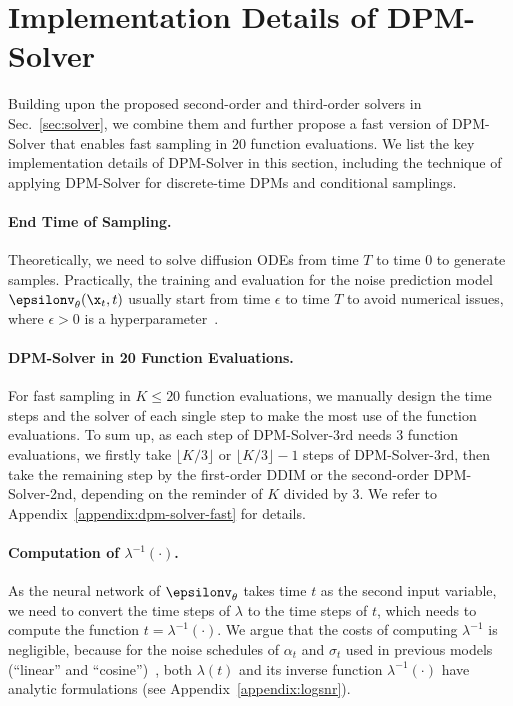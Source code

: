 \section{Implementation Details of DPM-Solver}


Building upon the proposed second-order and third-order solvers in Sec.~\ref{sec:solver}, we combine them and further propose a fast version of DPM-Solver that enables fast sampling in $20$ function evaluations. We list the key implementation details of DPM-Solver in this section, including the technique of applying DPM-Solver for discrete-time DPMs and conditional samplings.


\paragraph{End Time of Sampling.} 
Theoretically, we need to solve diffusion ODEs from time $T$ to time $0$ to generate samples. Practically, the training and evaluation for the noise prediction model $\epsilonv_\theta(\x_t,t)$ usually start from time $\epsilon$ to time $T$ to avoid numerical issues, where $\epsilon>0$ is a hyperparameter~\citep{song2020score}. 

\paragraph{DPM-Solver in 20 Function Evaluations.}
For fast sampling in $K \leq 20$ function evaluations, we manually design the time steps and the solver of each single step to make the most use of the function evaluations. To sum up, as each step of DPM-Solver-3rd needs $3$ function evaluations, we firstly take $\lfloor K / 3\rfloor$ or $\lfloor K / 3\rfloor - 1$ steps of DPM-Solver-3rd, then take the remaining step by the first-order DDIM or the second-order DPM-Solver-2nd, depending on the reminder of $K$ divided by $3$. We refer to Appendix~\ref{appendix:dpm-solver-fast} for details.

\paragraph{Computation of $\lambda^{-1}(\cdot)$.} 
As the neural network of $\epsilonv_\theta$ takes time $t$ as the second input variable, we need to convert the time steps of $\lambda$ to the time steps of $t$, which needs to compute the function $t=\lambda^{-1}(\cdot)$. We argue that the costs of computing $\lambda^{-1}$ is negligible, because for the noise schedules of $\alpha_t$ and $\sigma_t$ used in previous models (``linear'' and ``cosine'')~\citep{ho2020denoising,nichol2021improved}, both $\lambda(t)$ and its inverse function $\lambda^{-1}(\cdot)$ have analytic formulations (see Appendix~\ref{appendix:logsnr}).


